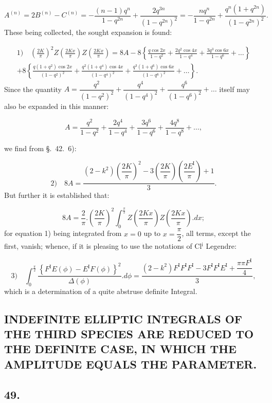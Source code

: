 \documentclass{article}
\begin{document}
\[
A^{(n)}=2B^{(n)}-C^{(n)}=-\frac{(n-1)q^{n}}{1-q^{2n}}+\frac{2q^{3n}}{(1-q^{2n})^{2}}=-\frac{nq^{n}}{1-q^{2n}}+\frac{q^{n}(1+q^{2n})}{(1-q^{2n})^{2}}.
\]
These being collected, the sought expansion is found:

\[
\begin{gathered}
\text{1)}\quad\left(\frac{2K}{\pi}\right)^{2}Z\left(\frac{2Kx}{\pi}\right)Z\left(\frac{2Kx}{\pi}\right)=8A-8\left\{\frac{q\cos2x}{1-q^{2}}+\frac{2q^{2}\cos4x}{1-q^{4}}+\frac{3q^{3}\cos6x}{1-q^{6}}+\ldots\right\}\\[1.5ex]
+8\left\{\frac{q(1+q^{2})\cos2x}{(1-q^{2})^{2}}+\frac{q^{2}(1+q^{4})\cos4x}{(1-q^{4})^{2}}+\frac{q^{3}(1+q^{6})\cos6x}{(1-q^{6})^{2}}+\ldots\right\}.
\end{gathered}
\]
Since the quantity $A=\dfrac{q^{2}}{(1-q^{2})^{2}}+\dfrac{q^{4}}{(1-q^{4})^{2}}+\dfrac{q^{6}}{(1-q^{6})^{2}}+\ldots$ itself may also be expanded in this manner:

\[
A=\frac{q^{2}}{1-q^{2}}+\frac{2q^{4}}{1-q^{4}}+\frac{3q^{6}}{1-q^{6}}+\frac{4q^{8}}{1-q^{8}}+\ldots,
\]

we find from §.\ 42.\ 6):

\[
\text{2)}\quad8A=\frac{(2-k^{2})\left(\dfrac{2K}{\pi}\right)^{2}-3\left(\dfrac{2K}{\pi}\right)\left(\dfrac{2E^{\mathrm{I}}}{\pi}\right)+1}{3}.
\]
But further it is established that:

\[
8A=\frac{2}{\pi}.\left(\frac{2K}{\pi}\right)^{2}\int_{0}^{\frac{\pi}{2}}Z\left(\frac{2Kx}{\pi}\right)Z\left(\frac{2Kx}{\pi}\right).dx;
\]
for equation 1) being integrated from $x=0$ up to $x=\dfrac{\pi}{2}$, all terms, except the first, vanish; whence, if it is pleasing to use the notations of Cl$^{\mathrm{i}}$ Legendre:

\[
\text{3)}\quad\int_{0}^{\frac{\pi}{2}}\frac{\left\{F^{\mathrm{I}}E(\phi)-E^{\mathrm{I}}F(\phi)\right\}^{2}}{\Delta(\phi)}.d\phi=\frac{(2-k^{2})F^{\mathrm{I}}F^{\mathrm{I}}F^{\mathrm{I}}-3F^{\mathrm{I}}F^{\mathrm{I}}E^{\mathrm{I}}+\dfrac{\pi\pi F^{\mathrm{I}}}{4}}{3},
\]
which is a determination of a quite abstruse definite Integral.

\subsection*{INDEFINITE ELLIPTIC INTEGRALS OF THE THIRD SPECIES ARE REDUCED TO THE DEFINITE CASE, IN WHICH THE AMPLITUDE EQUALS THE PARAMETER.}

\subsection*{49.}
\end{document}
